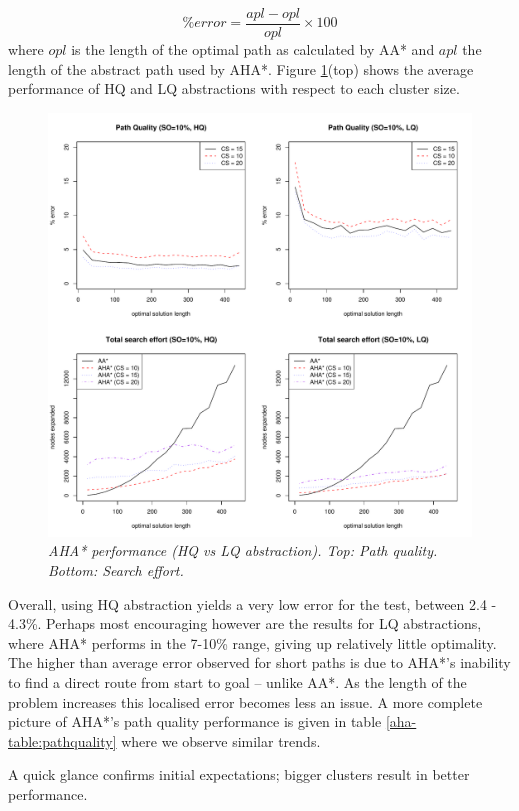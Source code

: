 $$ \%error = \frac{apl - opl}{opl} \times 100 $$ where $opl$ is the length of the optimal path as calculated by AA* and $apl$ the length of the abstract path used by AHA*.
Figure \ref{aha-fig:allgraphs}(top) shows the average performance of HQ and LQ abstractions with respect to each cluster size. 
\begin{figure}[htbp]
       \caption{\small{\emph{AHA* performance (HQ vs LQ abstraction). Top: Path quality. Bottom: Search effort. }}}
       \begin{center}
                       \includegraphics[scale=0.35]{diagrams/allgraphs.pdf}
       \end{center}
       \label{aha-fig:allgraphs}
\end{figure}
Overall, using HQ abstraction yields a very low error for the test, between 2.4 - 4.3\%. 
Perhaps most encouraging however are the results for LQ abstractions, where AHA* performs in the 7-10\% range, giving up relatively little optimality. 
The higher than average error observed for short paths is due to AHA*'s inability to find a direct route from start to goal -- unlike AA*.
As the length of the problem increases this localised error becomes less an issue.
A more complete picture of AHA*'s path quality performance is given in table \ref{aha-table:pathquality} where we observe similar trends. 

A quick glance confirms initial expectations; bigger clusters result in better performance. 
